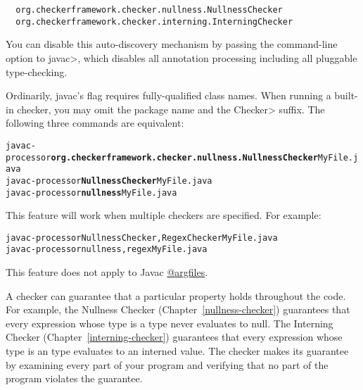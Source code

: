 \begin{smaller}
\begin{Verbatim}
  org.checkerframework.checker.nullness.NullnessChecker
  org.checkerframework.checker.interning.InterningChecker
\end{Verbatim}
\end{smaller}

You can disable this auto-discovery mechanism by passing the
 command-line option to \<javac>, which disables all
annotation processing including all pluggable type-checking.




Ordinarily, javac's  flag requires fully-qualified class names.
When running a built-in checker, you may
omit the package name and the \<Checker> suffix.
The following three commands are equivalent:

\begin{alltt}
  javac -processor \textbf{org.checkerframework.checker.nullness.NullnessChecker} MyFile.java
  javac -processor \textbf{NullnessChecker} MyFile.java
  javac -processor \textbf{nullness} MyFile.java
\end{alltt}

This feature will work when multiple checkers are specified.
For example:

\begin{alltt}
  javac -processor NullnessChecker,RegexChecker MyFile.java
  javac -processor nullness,regex MyFile.java
\end{alltt}

This feature does not apply to Javac \href{https://docs.oracle.com/javase/8/docs/technotes/tools/windows/javac.html#BHCJEIBB}{@argfiles}.



A checker can guarantee that a particular property holds throughout the
code.  For example, the Nullness Checker (Chapter~\ref{nullness-checker})
guarantees that every expression whose type is a  type never
evaluates to null.  The Interning Checker (Chapter~\ref{interning-checker})
guarantees that every expression whose type is an  type
evaluates to an interned value.  The checker makes its guarantee by
examining every part of your program and verifying that no part of the
program violates the guarantee.

